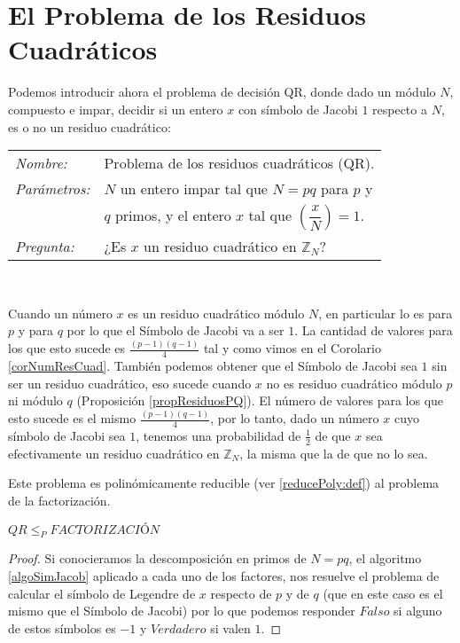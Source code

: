 \section{El Problema de los Residuos Cuadr\'aticos}

Podemos introducir ahora  el problema de decisión QR, donde dado un módulo $N$,
compuesto e impar, decidir si un entero $x$ con símbolo de Jacobi $1$ respecto
a $N$, es o no un residuo cuadrático:

\hfil

\begin{tabular}{|ll}\label{problemaQR}\index{Problema de los Residuos Cuadráticos}\index{QR}
	\textit{Nombre:} & Problema de los residuos cuadr\'aticos (QR). \\
	\textit{Parámetros:} & $N$ un entero impar tal que $N = pq$ para $p$ y \\
	& $q$ primos, y el entero $x$ tal que $\left( \dfrac{x}{N} \right) = 1$. \\
	\textit{Pregunta:} & ¿Es $x$ un residuo cuadrático en ${\mathbb Z}_N$? \\
\end{tabular}
\\

\hfil

Cuando un n\'umero $x$ es un residuo cuadr\'atico m\'odulo $N$, en particular lo
es para $p$ y para $q$ por lo que el S\'imbolo de Jacobi va a ser $1$. La cantidad
de valores para los que esto sucede es $\frac{(p-1)(q-1)}{4}$ tal y como vimos en
el Corolario \ref{corNumResCuad}. Tambi\'en podemos obtener que el S\'imbolo
de Jacobi sea $1$ sin ser un residuo cuadr\'atico, eso sucede cuando $x$ no es residuo
cuadr\'atico m\'odulo $p$ ni m\'odulo $q$ (Proposici\'on \ref{propResiduosPQ}). El n\'umero de valores para los que esto sucede
es el mismo $\frac{(p-1)(q-1)}{4}$, por lo tanto, dado un n\'umero $x$ cuyo s\'imbolo
de Jacobi sea $1$, tenemos una probabilidad de $\frac{1}{2}$ de que $x$ sea efectivamente
un residuo cuadr\'atico en ${\mathbb Z}_{N}$, la misma que la de que no lo sea.

Este problema es polin\'omicamente reducible (ver \ref{reducePoly:def}) al
problema de la factorizaci\'on.

\begin{proposition}
	 $QR \leq_P FACTORIZACIÓN$
\end{proposition}
\begin{proof}
Si conocieramos la descomposición en primos de $N = pq$, el algoritmo \ref{algoSimJacob} aplicado a cada uno de los factores,
nos resuelve el problema de calcular el símbolo de Legendre de $x$ respecto de $p$ y de $q$ (que en este caso es el mismo que el S\'imbolo de Jacobi)
por lo que podemos responder $Falso$ si alguno de estos s\'imbolos es $-1$ y $Verdadero$ si valen $1$.
\end{proof}

